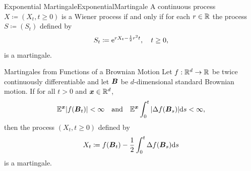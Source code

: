 \begin{thm}{Exponential Martingale}{ExponentialMartingale}
	A continuous process $X \coloneqq (X_t, t \ge 0)$ is a Wiener process if and only if for each $r \in \mathbb{R}$ the process $S \coloneqq (S_t)$ defined by
	\begin{equation}
		S_t \coloneqq \mathrm{e}^{r X_t - \frac{1}{2}r^2 t}, \quad t \ge 0,
		\label{eq:ExponentialMartingaleProcess}
	\end{equation}
	is a martingale.
\end{thm}

\begin{thm}{Martingales from Functions of a Brownian Motion}{}
	Let $f : \mathbb{R}^d \to \mathbb{R}$ be twice continuously differentiable and let $\boldsymbol{B}$ be $d$-dimensional standard Brownian motion. If for all $t > 0$ and $\boldsymbol{x} \in \mathbb{R}^d$,
	\begin{equation*}
		\mathbb{E}^{\boldsymbol{x}} |f(\boldsymbol{B}_t)| < \infty \quad \text{and} \quad \mathbb{E}^{\boldsymbol{x}} \int_0^t |\Delta f(\boldsymbol{B}_s)| \mathrm{d} s < \infty,
	\end{equation*}
	then the process $(X_t, t \ge 0)$ defined by
	\begin{equation}
		X_t \coloneqq f(\boldsymbol{B}_t) - \frac{1}{2} \int_0^t \Delta f(\boldsymbol{B}_s) \mathrm{d} s
		\label{eq:MartingaleFunctionProcess}
	\end{equation}
	is a martingale.
\end{thm}
